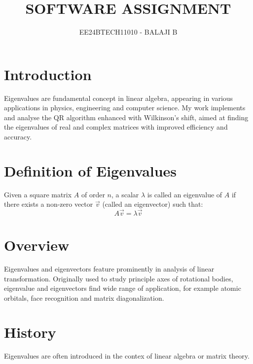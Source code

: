 \documentclass[journal]{IEEEtran}
\begin{document}

\vspace{3cm}

\title{SOFTWARE ASSIGNMENT}
\author{EE24BTECH11010 - BALAJI B}
{\let\newpage\relax\maketitle}

\renewcommand{\thefigure}{\theenumi}
\renewcommand{\thetable}{\theenumi}
\setlength{\intextsep}{10pt} %


\renewcommand{\thetable}{\theenumi}
\section{Introduction}
Eigenvalues are fundamental concept in linear algebra, appearing in various applications in physics, engineering and computer science. My work implements and  analyse the QR algorithm enhanced with Wilkinson's shift, aimed at finding the eigenvalues of real and complex matrices with improved efficiency and accuracy.

\section{Definition of Eigenvalues}
Given a square matrix $A$ of order $n$, a scalar $\lambda$ is called an eigenvalue of $A$ if there exists a non-zero vector $\vec{v}$  (called an eigenvector) such that:
\begin{equation}
A \vec{v} = \lambda \vec{v}
\end{equation}

\section{Overview}
Eigenvalues and eigenvectors feature prominently in analysis of linear transformation. Originally used to study principle axes of rotational bodies, eigenvalue and eigenvectors find wide range of application, for example atomic orbitals, face recognition and matrix diagonalization.

\section{History}
Eigenvalues are often introduced in the contex of linear algebra or matrix theory.  \\
\end{document}
